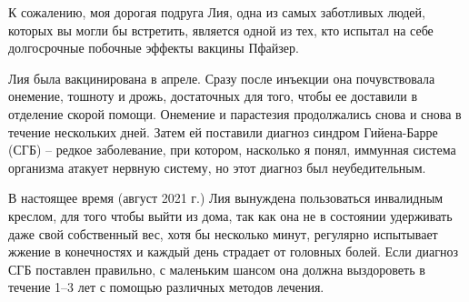 К сожалению, моя дорогая подруга Лия, одна из самых заботливых людей, которых вы
могли бы встретить, является одной из тех, кто испытал на себе долгосрочные
побочные эффекты вакцины Пфайзер.

Лия была вакцинирована в апреле. Сразу после инъекции она почувствовала
онемение, тошноту и дрожь, достаточных для того, чтобы ее доставили в отделение
скорой помощи. Онемение и парастезия продолжались снова и снова в течение
нескольких дней. Затем ей поставили диагноз синдром Гийена-Барре (СГБ) – редкое
заболевание, при котором, насколько я понял, иммунная система организма атакует
нервную систему, но этот диагноз был неубедительным.

В настоящее время (август 2021 г.) Лия вынуждена пользоваться инвалидным
креслом, для того чтобы выйти из дома, так как она не в состоянии удерживать
даже свой собственный вес, хотя бы несколько минут, регулярно испытывает жжение
в конечностях и каждый день страдает от головных болей. Если диагноз СГБ
поставлен правильно, с маленьким шансом она должна выздороветь в течение 1–3 лет
с помощью различных методов лечения.


